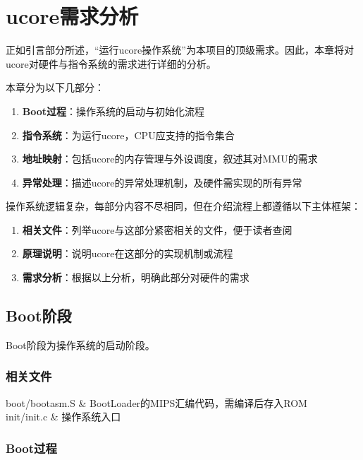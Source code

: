 \chapter{ucore需求分析}

正如引言部分所述，``运行ucore操作系统''为本项目的顶级需求。因此，本章将对ucore对硬件与指令系统的需求进行详细的分析。

本章分为以下几部分：
\begin{enumerate}
    \item {\bf Boot过程}：操作系统的启动与初始化流程
    \item {\bf 指令系统}：为运行ucore，CPU应支持的指令集合
    \item {\bf 地址映射}：包括ucore的内存管理与外设调度，叙述其对MMU的需求
    \item {\bf 异常处理}：描述ucore的异常处理机制，及硬件需实现的所有异常
\end{enumerate}

操作系统逻辑复杂，每部分内容不尽相同，但在介绍流程上都遵循以下主体框架：

\begin{enumerate}
    \item {\bf 相关文件}：列举ucore与这部分紧密相关的文件，便于读者查阅
    \item {\bf 原理说明}：说明ucore在这部分的实现机制或流程
    \item {\bf 需求分析}：根据以上分析，明确此部分对硬件的需求
\end{enumerate}

\section{Boot阶段}

Boot阶段为操作系统的启动阶段。

\subsection{相关文件}

    boot/bootasm.S & BootLoader的MIPS汇编代码，需编译后存入ROM \\
    init/init.c & 操作系统入口 \\
\tableend

\subsection{Boot过程}


